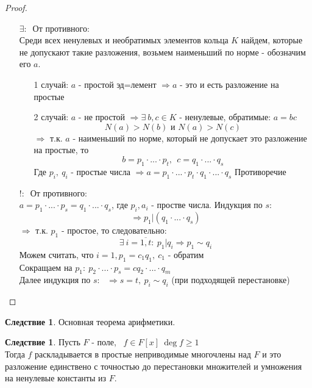 \documentclass[a4paper, 12pt]{article}
\newcommand\tab[1][.5cm]{\hspace*{#1}}
\newcounter{concount}
\theoremstyle{definition}
\newtheorem{consequensenum}[concount]{Следствие}
\begin{document}
  \begin{proof}\tab
    \begin{itemize}
      \item[ $\exists: \ $ ] От противного:\\
    Среди всех ненулевых и необратимых элементов кольца $K$ найдем, которые не допускают такие разложения, возьмем наименьший по норме - обозначим его $a$. 
    \begin{itemize}
      \item[1 случай: ] $a$ - простой эд=лемент $\Longrightarrow a$ - это и есть разложение на простые
      \item[2 случай: ] $a$ - не простой $\Longrightarrow \exists \ b, c \in K$ - ненулевые, обратимые: $a = bc$
      $$N(a)>N(b) \text{ и } N(a)>N(c)$$
      $\Longrightarrow $ т.к. $a$ - наименьший по норме, который не допускает это разложение на простые, то 
      $$b = p_1\cdot ... \cdot p_t, \ \ c = q_1\cdot ... \cdot q_s$$
      Где $p_i, \ q_i$ - простые числа $\Longrightarrow a = p_1\cdot ... \cdot p_t\cdot q_1\cdot ... \cdot q_s$ Противоречие 
    \end{itemize}
    \item[ $!: \ $ ] От противного:\\
    $a = p_1\cdot ... \cdot p_s = q_1\cdot ... \cdot q_s$, где $p_i, a_i$ - простве числа. Индукция по $s$:  
    $$\Longrightarrow p_1 | (q_1\cdot ... \cdot q_s)$$
    $\Longrightarrow $  т.к. $p_1$ - простое, то следовательно: 
    $$\exists \ i = \overline{1,t}: \ p_1 | q_i \Longrightarrow p_1\sim q_i$$
    Можем считать, что $i =1, p_1 = c_1q_1, \ c_1$ - обратим\\
    Сокращаем на $p_1 : \ p_2\cdot ... \cdot p_s = cq_2\cdot ...\cdot q_m$\\
    Далее индукция по $s$: \ $\Longrightarrow s=t, \ p_i \sim q_i$ (при подходящей перестановке)  
    \end{itemize}
  \end{proof}
  \setcounter{concount}{0}
  \begin{consequensenum}
    Основная теорема арифметики.
  \end{consequensenum}
  \begin{consequensenum}
    Пусть $F$ - поле, \ $f\in F[x] \ \deg f \geq 1$\\
    Тогда $f$ раскладывается в простые неприводимые многочлены над $F$ и это разложение единствено с точностью до перестановки множителей и умножения на ненулевые константы из $F$.      
  \end{consequensenum}
\end{document}
